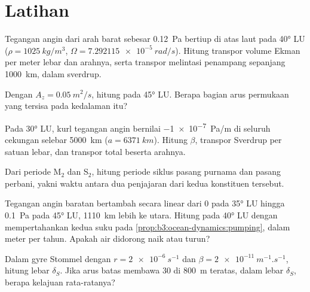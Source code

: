 \section{Latihan}

\begin{exercise}[$\star$]\label{exo:b3:ocean-dynamics:1}
Tegangan angin dari arah barat sebesar \qty{0.12}{Pa} bertiup di atas laut pada \ang{40} LU
($\rho = \qty{1025}{kg/m^3}$, $\Omega = \qty{7.292115e-5}{rad/s}$).
Hitung transpor volume Ekman per meter lebar dan arahnya,
serta transpor melintasi penampang sepanjang \qty{1000}{km}, dalam sverdrup.
\end{exercise}

\begin{exercise}[$\star$]\label{exo:b3:ocean-dynamics:2}
Dengan $A_z = \qty{0.05}{m^2/s}$, hitung  pada \ang{45} LU. Berapa
bagian arus permukaan yang tersisa pada kedalaman itu?
\end{exercise}

\begin{exercise}[$\star$]\label{exo:b3:ocean-dynamics:3}
Pada \ang{30} LU, kurl tegangan angin bernilai \qty{-1e-7}{Pa/m} di seluruh
cekungan selebar \qty{5000}{km} ($a = \qty{6371}{km}$). Hitung $\beta$, transpor
Sverdrup per satuan lebar, dan transpor total beserta
arahnya.
\end{exercise}

\begin{exercise}[$\star$]\label{exo:b3:ocean-dynamics:4}
Dari periode M$_2$ dan S$_2$, hitung periode siklus pasang purnama
dan pasang perbani, yakni waktu antara dua penjajaran dari kedua
konstituen tersebut.
\end{exercise}

\begin{exercise}[$\star\star$]\label{exo:b3:ocean-dynamics:5}
Tegangan angin baratan bertambah secara linear dari 0 pada \ang{35} LU hingga \qty{0.1}{Pa} pada
\ang{45} LU, \qty{1110}{km} lebih ke utara. Hitung  pada
\ang{40} LU dengan mempertahankan kedua suku pada \cref{prop:b3:ocean-dynamics:pumping},
dalam meter per tahun. Apakah air didorong naik atau turun?
\end{exercise}

\begin{exercise}[$\star\star$]\label{exo:b3:ocean-dynamics:6}
Dalam gyre Stommel dengan $r = \qty{2e-6}{s^{-1}}$ dan $\beta =
\qty{2e-11}{m^{-1}.s^{-1}}$, hitung lebar $\delta_S$. Jika arus batas
membawa \qty{30}{\sverdrup} di \qty{800}{m} teratas, dalam
lebar $\delta_S$, berapa kelajuan rata-ratanya?
\end{exercise}

